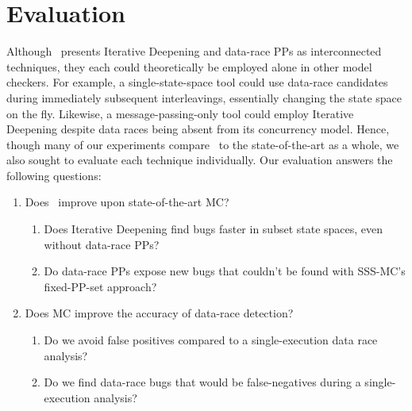 
\section{Evaluation}
\label{sec:eval}

Although \quicksand~presents Iterative Deepening and data-race PPs as interconnected techniques, they each could theoretically be employed alone in other model checkers.
For example, a single-state-space tool could use data-race candidates during immediately subsequent interleavings, essentially changing the state space on the fly.
Likewise, a message-passing-only tool could employ Iterative Deepening despite data races being absent from its concurrency model.
Hence, though many of our experiments compare \quicksand~to the state-of-the-art as a whole,
we also sought to evaluate each technique individually.
Our evaluation answers the following questions:
\begin{enumerate}

	\item Does \quicksand~improve upon state-of-the-art MC?
		\begin{enumerate}
			\item Does Iterative Deepening find bugs faster
				in subset state spaces, even without data-race PPs?
			\item Do data-race PPs expose new bugs that couldn't be found with SSS-MC's fixed-PP-set approach?
		\end{enumerate}
	\item Does MC improve the accuracy of data-race detection?
		\begin{enumerate}
			\item Do we avoid false positives compared to a single-execution data race analysis?
			\item Do we find data-race bugs that would be false-negatives during a single-execution analysis?%
		\end{enumerate}
\end{enumerate}

